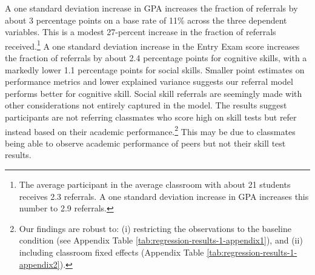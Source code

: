 \documentclass[11pt,a4paper,oneside]{article}
\begin{document}
A one standard deviation increase in GPA increases the fraction of referrals by about 3 percentage points on a base rate of 11\% across the three dependent variables. This is a modest 27-percent increase in the fraction of referrals received.\footnote{The average participant in the average classroom with about 21 students receives 2.3 referrals. A one standard deviation increase in GPA increases this number to 2.9 referrals.} A one standard deviation increase in the Entry Exam score increases the fraction of referrals by about 2.4 percentage points for cognitive skills, with a markedly lower 1.1 percentage points for social skills. Smaller point estimates on performance metrics and lower explained variance suggests our referral model performs better for cognitive skill. Social skill referrals are seemingly made with other considerations not entirely captured in the model. The results suggest participants are not referring classmates who score high on skill tests but refer instead based on their academic performance.\footnote{Our findings are robust to: (i) restricting the observations to the baseline condition (see Appendix Table \ref{tab:regression-results-1-appendix1}), and (ii) including classroom fixed effects (Appendix Table \ref{tab:regression-results-1-appendix2}).} This may be due to classmates being able to observe academic performance of peers but not their skill test results.

\end{document}
